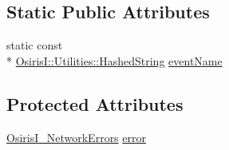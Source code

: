 \subsection*{Static Public Attributes}
\begin{DoxyCompactItemize}
\item 
static const \\*
\hyperlink{class_osiris_i_1_1_utilities_1_1_hashed_string}{Osiris\-I\-::\-Utilities\-::\-Hashed\-String} \hyperlink{struct_osiris_i_1_1_events_1_1_osiris_i___network_error_event_a2763c379c2516e7c67970fb20ebc5dd8}{event\-Name}
\end{DoxyCompactItemize}
\subsection*{Protected Attributes}
\begin{DoxyCompactItemize}
\item 
\hyperlink{namespace_osiris_i_1_1_events_a9349e2e7af9d6c26d7ce997b34a12253}{Osiris\-I\-\_\-\-Network\-Errors} \hyperlink{struct_osiris_i_1_1_events_1_1_osiris_i___network_error_event_a6a05c912c272bd233fcfad27c134f18a}{error}
\end{DoxyCompactItemize}


